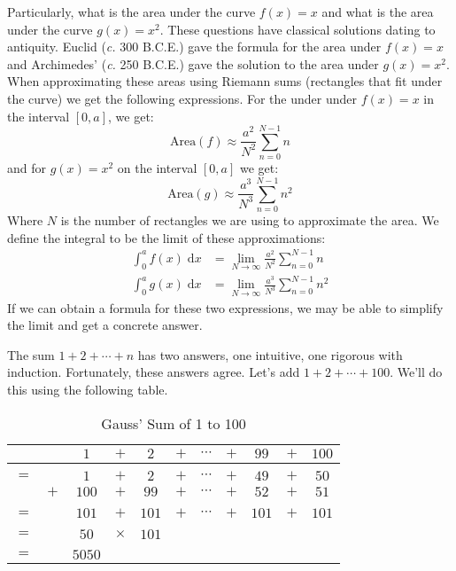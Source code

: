 \documentclass{article}
\theoremstyle{normal}
\begin{document}
    Particularly, what is the area under the curve $f(x)=x$ and what is the
    area under the curve $g(x)=x^{2}$. These questions have classical solutions
    dating to antiquity. Euclid (\textit{c.} 300 B.C.E.) gave the formula for
    the area under $f(x)=x$ and Archimedes' (\textit{c.} 250 B.C.E.) gave the
    solution to the area under $g(x)=x^{2}$. When approximating these areas
    using Riemann sums (rectangles that fit under the curve) we get the
    following expressions. For the under under $f(x)=x$ in the interval
    $[0,a]$, we get:
    \begin{equation}
        \textrm{Area}(f)\approx\frac{a^{2}}{N^{2}}
            \sum_{n=0}^{N-1}n
    \end{equation}
    and for $g(x)=x^{2}$ on the interval $[0,a]$ we get:
    \begin{equation}
        \textrm{Area}(g)\approx\frac{a^{3}}{N^{3}}
            \sum_{n=0}^{N-1}n^{2}
    \end{equation}
    Where $N$ is the number of rectangles we are using to approximate the area.
    We define the integral to be the limit of these approximations:
    \begin{align}
        \int_{0}^{a}f(x)\;\textrm{d}x
            &=\lim_{N\rightarrow\infty}\frac{a^{2}}{N^{2}}\sum_{n=0}^{N-1}n\\
            \int_{0}^{a}g(x)\;\textrm{d}x
                &=\lim_{N\rightarrow\infty}
                \frac{a^{3}}{N^{3}}\sum_{n=0}^{N-1}n^{2}
    \end{align}
    If we can obtain a formula for these two expressions, we may be able to
    simplify the limit and get a concrete answer.
    \par\hfill\par
    The sum $1+2+\cdots+n$ has two answers, one intuitive, one rigorous with
    induction. Fortunately, these answers agree. Let's add
    $1+2+\cdots+100$. We'll do this using the following table.
    \begin{table}
        \centering
        \begin{tabular}{ccccccccccc}
            &&$1$&$+$&$2$&$+$&$\cdots$&$+$&$99$&$+$&$100$\\
            \hline\\
            $=$&&$1$&$+$&$2$&$+$&$\cdots$&$+$&$49$&$+$&$50$\\
            &$+$&$100$&$+$&$99$&$+$&$\cdots$&$+$&$52$&$+$&$51$\\
            \hline\\
            $=$&&$101$&$+$&$101$&$+$&$\cdots$&$+$&$101$&$+$&$101$\\
            \hline\\
            $=$&&$50$&$\times$&$101$\\
            \hline\\
            $=$&&$5050$
        \end{tabular}
        \caption{Gauss' Sum of 1 to 100}
    \end{table}
\end{document}
